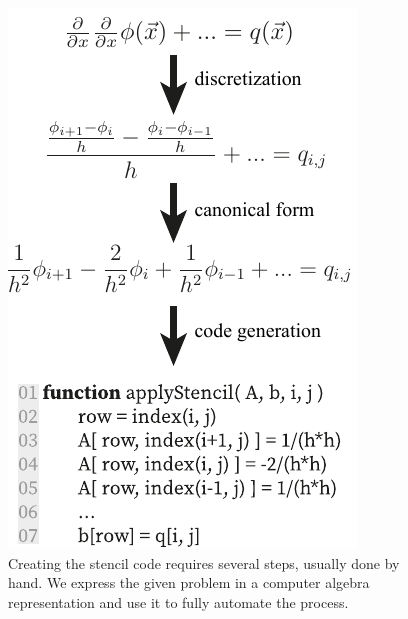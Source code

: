 \documentclass{egpubl}
\newcommand{\icaption}[1]{\caption{#1}}
\begin{document}
\vspace{0.1in}

\begin{figure}[h]
\centering
\includegraphics[width=0.7\columnwidth]{fig_stencil_pipeline_small.pdf}
\icaption{Creating the stencil code requires several steps, usually done by hand. We express the given problem in a computer algebra representation and use it to fully automate the process.}
\label{fig:stencile_pipeline}
\end{figure}

\vspace{0.2in}
\end{document}
